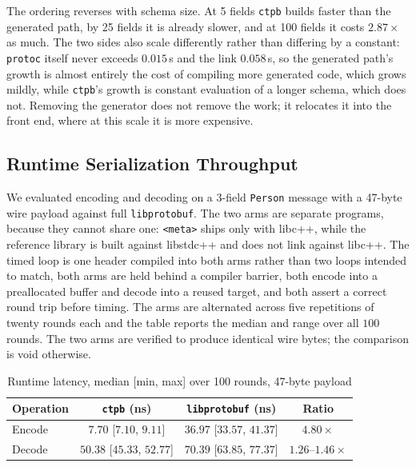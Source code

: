 The ordering reverses with schema size. At 5 fields \texttt{ctpb} builds faster than the generated path, by 25 fields it is already slower, and at 100 fields it costs $2.87\times$ as much. The two sides also scale differently rather than differing by a constant: \texttt{protoc} itself never exceeds $0.015$\,s and the link $0.058$\,s, so the generated path's growth is almost entirely the cost of compiling more generated code, which grows mildly, while \texttt{ctpb}'s growth is constant evaluation of a longer schema, which does not. Removing the generator does not remove the work; it relocates it into the front end, where at this scale it is more expensive.

\subsection{Runtime Serialization Throughput}
\label{sec:runtime_comparison}
We evaluated encoding and decoding on a 3-field \texttt{Person} message with a 47-byte wire payload against full \texttt{libprotobuf}. The two arms are separate programs, because they cannot share one: \texttt{<meta>} ships only with libc++, while the reference library is built against libstdc++ and does not link against libc++. The timed loop is one header compiled into both arms rather than two loops intended to match, both arms are held behind a compiler barrier, both encode into a preallocated buffer and decode into a reused target, and both assert a correct round trip before timing. The arms are alternated across five repetitions of twenty rounds each and the table reports the median and range over all $100$ rounds. The two arms are verified to produce identical wire bytes; the comparison is void otherwise.

\begin{table}[ht]
\centering
\caption{Runtime latency, median [min, max] over 100 rounds, 47-byte payload}
\label{tab:runtime_comparison}
\renewcommand{\arraystretch}{1.15}
\setlength{\tabcolsep}{1pt}
\scriptsize
\begin{tabular}{lccc}
\hline
\textbf{Operation} & \textbf{\texttt{ctpb} (ns)} & \textbf{\texttt{libprotobuf} (ns)} & \textbf{Ratio} \\
\hline
Encode & $7.70$ [$7.10$, $9.11$] & $36.97$ [$33.57$, $41.37$] & $4.80\times$ \\
Decode & $50.38$ [$45.33$, $52.77$] & $70.39$ [$63.85$, $77.37$] & $1.26$--$1.46\times$ \\
\hline
\end{tabular}
\end{table}

